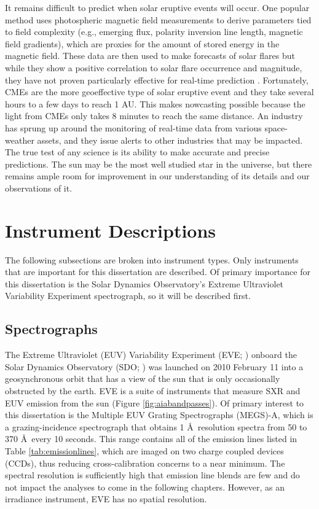 It remains difficult to predict when solar eruptive events will occur. One popular method uses photospheric magnetic field measurements to derive parameters tied to field complexity (e.g., emerging flux, polarity inversion line length, magnetic field gradients), which are proxies for the amount of stored energy in the magnetic field. These data are then used to make forecasts of solar flares but while they show a positive correlation to solar flare occurrence and magnitude, they have not proven particularly effective for real-time prediction \citep{Mason2010}. Fortunately, CMEs are the more geoeffective type of solar eruptive event and they take several hours to a few days to reach 1 AU. This makes nowcasting possible because the light from CMEs only takes 8 minutes to reach the same distance. An industry has sprung up around the monitoring of real-time data from various space-weather assets, and they issue alerts to other industries that may be impacted. The true test of any science is its ability to make accurate and precise predictions. The sun may be the most well studied star in the universe, but there remains ample room for improvement in our understanding of its details and our observations of it. 

\section{Instrument Descriptions}
\label{sec:instruments}

The following subsections are broken into instrument types. Only instruments that are important for this dissertation are described. Of primary importance for this dissertation is the Solar Dynamics Observatory's Extreme Ultraviolet Variability Experiment spectrograph, so it will be described first. 

\subsection{Spectrographs}
The Extreme Ultraviolet (EUV) Variability Experiment (EVE; \citealt{Woods2012}) onboard the Solar Dynamics Observatory (SDO; \citealt{Pesnell2012}) was launched on 2010 February 11 into a geosynchronous orbit that has a view of the sun that is only occasionally obstructed by the earth. EVE is a suite of instruments that measure SXR and EUV emission from the sun (Figure \ref{fig:aiabandpasses}). Of primary interest to this dissertation is the Multiple EUV Grating Spectrographs (MEGS)-A, which is a grazing-incidence spectrograph that obtains 1 \AA\ resolution spectra from 50 to 370 \AA\ every 10 seconds. This range contains all of the emission lines listed in Table \ref{tab:emissionlines}, which are imaged on two charge coupled devices (CCDs), thus reducing cross-calibration concerns to a near minimum. The spectral resolution is sufficiently high that emission line blends are few and do not impact the analyses to come in the following chapters. However, as an irradiance instrument, EVE has no spatial resolution. 

